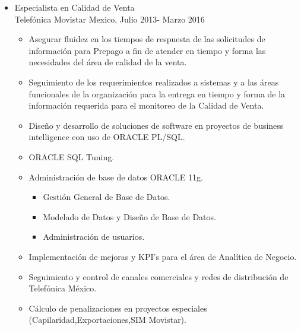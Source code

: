 \documentclass[21pt, onecolumn]{article} %
\begin{document}
\begin{itemize}
 \item Especialista en Calidad de  Venta\\
 Telefónica Movistar Mexico, {Julio 2013- Marzo 2016}
 \begin{itemize}
\item Asegurar  fluidez en los tiempos de respuesta de las solicitudes de información para Prepago a fin de  atender en tiempo y forma las necesidades del área de calidad de la venta.
\item Seguimiento de los requerimientos realizados a sistemas y a las áreas funcionales de la organización para la entrega en tiempo y forma de la información requerida para el monitoreo de la Calidad de Venta.
\item Diseño y desarrollo de soluciones de software en proyectos de business intelligence con uso de ORACLE PL/SQL.
\item ORACLE SQL Tuning.
\item Administración de base de datos ORACLE 11g.
\begin{itemize}
	\item Gestión General de Base de Datos.
	\item Modelado de Datos y Diseño de Base de Datos.
	\item Administración de  usuarios.
\end{itemize}
\item Implementación de mejoras  y KPI's para el área de Analítica de Negocio.
\item Seguimiento  y control de  canales comerciales y redes de distribución de Telefónica México.
\item Cálculo de penalizaciones en proyectos especiales (Capilaridad,Exportaciones,SIM Movistar).
 \end{itemize}
\end{itemize}
\end{document}
